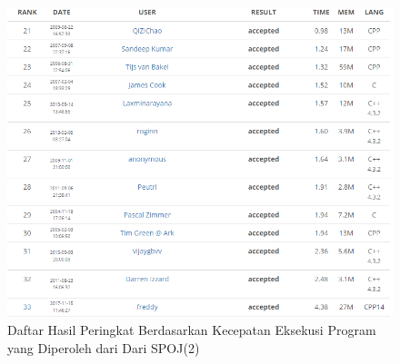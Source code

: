   \begin{figure}[H]
  \centering
  	\includegraphics[scale=0.55]{images/lampiran/rankdiatas2.png}
  	\caption{Daftar Hasil Peringkat Berdasarkan Kecepatan Eksekusi Program yang Diperoleh dari Dari SPOJ(2)}
  	\label{fig:per2}
  \end{figure}
  
